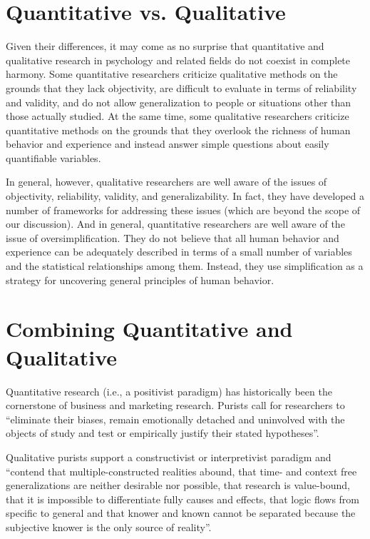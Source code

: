 \section{Quantitative vs. Qualitative}

Given their differences, it may come as no surprise that quantitative and qualitative research in psychology and related fields do not coexist in complete harmony. Some quantitative researchers criticize qualitative methods on the grounds that they lack objectivity, are difficult to evaluate in terms of reliability and validity, and do not allow generalization to people or situations other than those actually studied. At the same time, some qualitative researchers criticize quantitative methods on the grounds that they overlook the richness of human behavior and experience and instead answer simple questions about easily quantifiable variables.

In general, however, qualitative researchers are well aware of the issues of objectivity, reliability, validity, and generalizability. In fact, they have developed a number of frameworks for addressing these issues (which are beyond the scope of our discussion). And in general, quantitative researchers are well aware of the issue of oversimplification. They do not believe that all human behavior and experience can be adequately described in terms of a small number of variables and the statistical relationships among them. Instead, they use simplification as a strategy for uncovering general principles of human behavior.

\section{Combining Quantitative and Qualitative}

Quantitative research (i.e., a positivist paradigm) has historically been the cornerstone of business and marketing research. Purists call for researchers to ``eliminate their biases, remain emotionally detached and uninvolved with the objects of study and test or empirically justify their stated hypotheses''\cite{johnson2004mixed}.

Qualitative purists support a constructivist or interpretivist paradigm and ``contend that multiple-constructed realities abound, that time- and context free generalizations are neither desirable nor possible, that research is value-bound, that it is impossible to differentiate fully causes and effects, that logic flows from specific to general and that knower and known cannot be separated because the subjective knower is the only source of reality''\cite{johnson2004mixed}.

